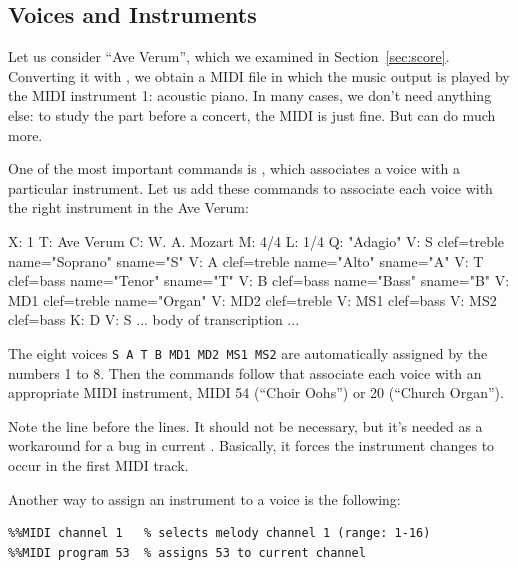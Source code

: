 \documentclass[a4paper,12pt]{book}
\begin{document}

\subsection{Voices and Instruments}

Let us consider ``Ave Verum'', which we examined in
Section~\ref{sec:score}. Converting it with \abcmid, we obtain a MIDI
file in which the music output is played by the MIDI instrument 1:
acoustic piano. In many cases, we don't need anything else: to study
the part before a concert, the MIDI is just fine. But \abcmid{} can do
much more.

One of the most important \abcmid{} commands is , which associates a voice with a particular instrument. Let
us add these commands to associate each voice with the right
instrument in the Ave Verum:

\begin{abcsource}
X: 1
T: Ave Verum
C: W. A. Mozart
M: 4/4
L: 1/4
Q: "Adagio"
V: S clef=treble name="Soprano" sname="S"
V: A clef=treble name="Alto" sname="A"
V: T clef=bass name="Tenor" sname="T"
V: B clef=bass name="Bass" sname="B"
V: MD1 clef=treble name="Organ"
V: MD2 clef=treble
V: MS1 clef=bass
V: MS2 clef=bass
K: D
%
V: S %
... body of transcription ...
\end{abcsource}

The eight voices \texttt{S A T B MD1 MD2 MS1 MS2} are automatically
assigned by \abcmid{} the numbers 1 to 8. Then the  commands follow that associate each voice with an appropriate
MIDI instrument, MIDI 54 (``Choir Oohs'') or 20 (``Church Organ'').

Note the  line before the  lines. It
should not be necessary, but it's needed as a workaround for a bug in
current \abcmid. Basically, it forces the instrument changes to occur
in the first MIDI track.

Another way to assign an instrument to a voice is the following:

\begin{verbatim}
%%MIDI channel 1   % selects melody channel 1 (range: 1-16)
%%MIDI program 53  % assigns 53 to current channel
\end{verbatim}
\end{document}
